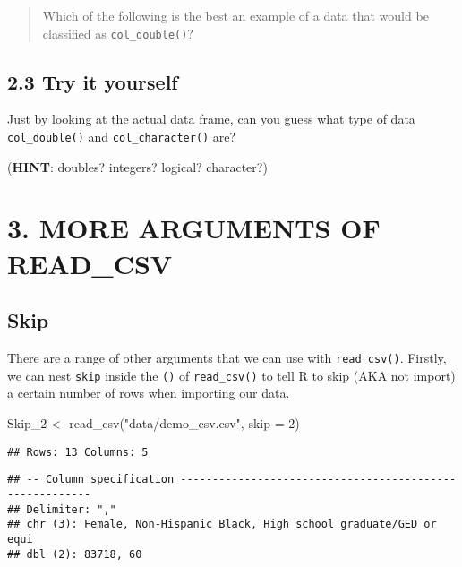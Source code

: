 \documentclass[
]{book}
\newenvironment{Shaded}{\begin{snugshade}}{\end{snugshade}}
\newcommand{\AttributeTok}[1]{\textcolor[rgb]{0.77,0.63,0.00}{#1}}
\newcommand{\DecValTok}[1]{\textcolor[rgb]{0.00,0.00,0.81}{#1}}
\newcommand{\FunctionTok}[1]{\textcolor[rgb]{0.00,0.00,0.00}{#1}}
\newcommand{\NormalTok}[1]{#1}
\newcommand{\OtherTok}[1]{\textcolor[rgb]{0.56,0.35,0.01}{#1}}
\newcommand{\StringTok}[1]{\textcolor[rgb]{0.31,0.60,0.02}{#1}}
\begin{document}
\begin{quote}
Which of the following is the best an example of a data that would be classified as \texttt{col\_double()}?
\end{quote}

\hypertarget{try-it-yourself-11}{%
\subsection{2.3 Try it yourself}\label{try-it-yourself-11}}

Just by looking at the actual data frame, can you guess what type of data \texttt{col\_double()} and \texttt{col\_character()} are?

(\textbf{HINT}: doubles? integers? logical? character?)

\hypertarget{more-arguments-of-read_csv}{%
\section{3. MORE ARGUMENTS OF READ\_CSV}\label{more-arguments-of-read_csv}}

\hypertarget{skip}{%
\subsection{Skip}\label{skip}}

There are a range of other arguments that we can use with \texttt{read\_csv()}. Firstly, we can nest \texttt{skip} inside the \texttt{()} of \texttt{read\_csv()} to tell R to skip (AKA not import) a certain number of rows when importing our data.

\begin{Shaded}
\begin{Highlighting}[]
\NormalTok{Skip\_2 }\OtherTok{\textless{}{-}} \FunctionTok{read\_csv}\NormalTok{(}\StringTok{"data/demo\_csv.csv"}\NormalTok{, }\AttributeTok{skip =} \DecValTok{2}\NormalTok{)}
\end{Highlighting}
\end{Shaded}

\begin{verbatim}
## Rows: 13 Columns: 5
\end{verbatim}

\begin{verbatim}
## -- Column specification --------------------------------------------------------
## Delimiter: ","
## chr (3): Female, Non-Hispanic Black, High school graduate/GED or equi
## dbl (2): 83718, 60
\end{verbatim}
\end{document}
